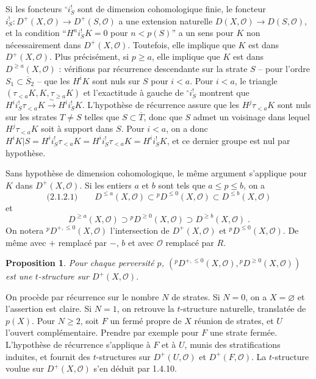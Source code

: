 \documentclass[12pt,a4paper]{article}
\theoremstyle{plain}
\newtheorem{proposition}[theorem]{Proposition}
\theoremstyle{definition}
\begin{document}
Si les foncteurs ${}^\circ i_S^!$ sont de dimension cohomologique finie, le foncteur $i_S^! : D^+(X, \mathcal{O}) \to D^+(S, \mathcal{O})$ a une extension naturelle $D(X, \mathcal{O}) \to D(S, \mathcal{O})$, et la condition ``$H^n i_S^! K = 0$ pour $n < p(S)$'' a un sens pour $K$ non n\'ecessairement dans $D^+(X, \mathcal{O})$. Toutefois, elle implique que $K$ est dans $D^+(X, \mathcal{O})$. Plus pr\'ecis\'ement, si $p \geqslant a$, elle implique que $K$ est dans $D^{\geqslant a}(X, \mathcal{O})$ : v\'erifions par r\'ecurrence descendante sur la strate $S$ -- pour l'ordre $S_1 \subset \overline{S}_2$ -- que les $H^i K$ sont nuls sur $S$ pour $i < a$. Pour $i < a$, le triangle $(\tau_{< a} K, K, \tau_{\geqslant a} K)$ et l'exactitude \`a gauche de ${}^\circ i_S^!$ montrent que $H^i i_S^! \tau_{< a} K \xrightarrow{\;\sim\;} H^i i_S^! K$. L'hypoth\`ese de r\'ecurrence assure que les $H^j \tau_{< a} K$ sont nuls sur les strates $T \neq S$ telles que $S \subset \overline{T}$, donc que $S$ admet un voisinage dans lequel $H^j \tau_{< a} K$ soit \`a support dans $S$. Pour $i < a$, on a donc $H^i K|S = H^i i_S^! \tau_{< a} K = H^i i_S^! \tau_{< a} K = H^i i_S^! K$, et ce dernier groupe est nul par hypoth\`ese.

Sans hypoth\`ese de dimension cohomologique, le m\^eme argument s'applique pour $K$ dans $D^+(X, \mathcal{O})$. Si les entiers $a$ et $b$ sont tels que $a \leqslant p \leqslant b$, on a
\[
\text{(2.1.2.1)}\qquad D^{\leqslant a}(X, \mathcal{O}) \subset {}^p D^{\leqslant 0}(X, \mathcal{O}) \subset D^{\leqslant b}(X, \mathcal{O})
\]
et
\[
D^{\geqslant a}(X, \mathcal{O}) \supset {}^p D^{\geqslant 0}(X, \mathcal{O}) \supset D^{\geqslant b}(X, \mathcal{O})\;.
\]
On notera ${}^p D^{+, \leqslant 0}(X, \mathcal{O})$ l'intersection de $D^+(X, \mathcal{O})$ et ${}^p D^{\leqslant 0}(X, \mathcal{O})$. De m\^eme avec $+$ remplac\'e par $-$, $b$ et avec $\mathcal{O}$ remplac\'e par $R$.

\begin{proposition}\label{prop:2.1.3}
Pour chaque perversit\'e $p$, $({}^p D^{+, \leqslant 0}(X, \mathcal{O}), {}^p D^{\geqslant 0}(X, \mathcal{O}))$ est une $t$-structure sur $D^+(X, \mathcal{O})$.
\end{proposition}

On proc\`ede par r\'ecurrence sur le nombre $N$ de strates. Si $N = 0$, on a $X = \varnothing$ et l'assertion est claire. Si $N = 1$, on retrouve la $t$-structure naturelle, translat\'ee de $p(X)$. Pour $N \geqslant 2$, soit $F$ un ferm\'e propre de $X$ r\'eunion de strates, et $U$ l'ouvert compl\'ementaire. Prendre par exemple pour $F$ une strate ferm\'ee. L'hypoth\`ese de r\'ecurrence s'applique \`a $F$ et \`a $U$, munis des stratifications induites, et fournit des $t$-structures sur $D^+(U, \mathcal{O})$ et $D^+(F, \mathcal{O})$. La $t$-structure voulue sur $D^+(X, \mathcal{O})$ s'en d\'eduit par 1.4.10.
\end{document}
